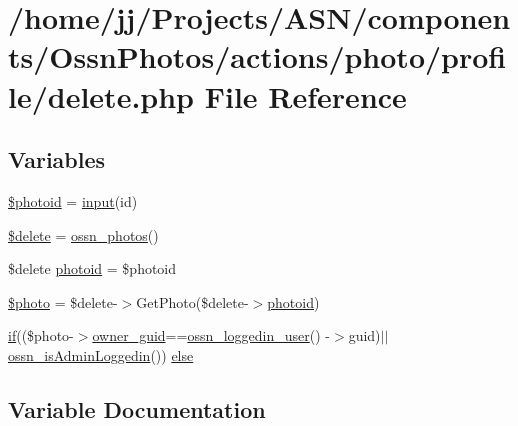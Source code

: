 \hypertarget{components_2_ossn_photos_2actions_2photo_2profile_2delete_8php}{}\section{/home/jj/\+Projects/\+A\+S\+N/components/\+Ossn\+Photos/actions/photo/profile/delete.php File Reference}
\label{components_2_ossn_photos_2actions_2photo_2profile_2delete_8php}
\subsection*{Variables}
\begin{DoxyCompactItemize}
\item 
\hyperlink{components_2_ossn_photos_2actions_2photo_2profile_2delete_8php_a7407adedcade878fe9a46a9abd70298f}{\$photoid} = \hyperlink{ossn_8lib_8input_8php_a64ebee98b041c4f75f71ed3cd73cc8ed}{input}(\textquotesingle{}id\textquotesingle{})
\item 
\hyperlink{components_2_ossn_photos_2actions_2photo_2profile_2delete_8php_aba2374a8b713514611e21494ec2fef8d}{\$delete} = \hyperlink{ossn_8lib_8photos_8php_a66e905f107ea10ae8c2aa549b9234c5a}{ossn\+\_\+photos}()
\item 
\$delete \hyperlink{components_2_ossn_photos_2actions_2photo_2profile_2delete_8php_abb6af812fbce2cbbad5fc22cdbb4d396}{photoid} = \$photoid
\item 
\hyperlink{components_2_ossn_photos_2actions_2photo_2profile_2delete_8php_ae68c67c422f1090027f6eb6ba01b62b2}{\$photo} = \$delete-\/$>$Get\+Photo(\$delete-\/$>$\hyperlink{components_2_ossn_photos_2actions_2photo_2profile_2delete_8php_abb6af812fbce2cbbad5fc22cdbb4d396}{photoid})
\item 
\hyperlink{jquery_8tokeninput_8js_ad8dd46a3cbc004569e34401e9e71771a}{if}((\$photo-\/$>$\hyperlink{user_8php_a307051fefc937afd02c509c55646f50b}{owner\+\_\+guid}==\hyperlink{ossn_8lib_8users_8php_aa3c8068d0e6638b414d6a2f6c62565b8}{ossn\+\_\+loggedin\+\_\+user}() -\/$>$guid)$\vert$$\vert$\hyperlink{ossn_8lib_8users_8php_abf45a4c659ffd196160e8173c2af1106}{ossn\+\_\+is\+Admin\+Loggedin}()) \hyperlink{components_2_ossn_photos_2actions_2photo_2profile_2delete_8php_a184756f75a17a1d7c2189795e74832b3}{else}
\end{DoxyCompactItemize}


\subsection{Variable Documentation}
